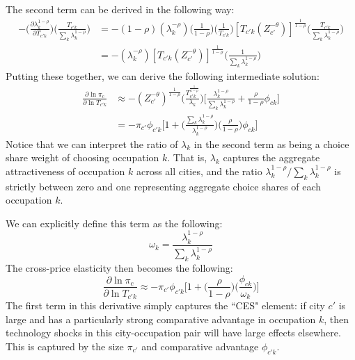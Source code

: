 \documentclass[12pt]{article}
\begin{document}
The second term can be derived in the following way:
\begin{align*}
    - \Big(\frac{\partial\lambda_{k}^{1-\rho}}{\partial{T_{{c'}k}}}\Big)\Big(\frac{T_{{c'}k}}{{\sum\limits_{k}\lambda_{k}^{1-\rho}}}\Big) & = - (1-\rho)(\lambda_{k}^{-\rho})\Big(\frac{1}{1-\rho}\Big)\Big(\frac{1}{T_{{c'}k}}\Big)[{T_{{c'}k}}(Z_{c'}^{-\theta})]^{\frac{1}{1-\rho}}\Big(\frac{T_{{c'}k}}{{\sum\limits_{k}\lambda_{k}^{1-\rho}}}\Big) \\ &= - (\lambda_{k}^{-\rho})[{T_{{c'}k}}(Z_{c'}^{-\theta})]^{\frac{1}{1-\rho}}\Big(\frac{1}{{\sum\limits_{k}\lambda_{k}^{1-\rho}}}\Big)
\end{align*}
Putting these together, we can derive the following intermediate solution:
\begin{align*}
    \frac{\partial\ln{\pi_{c}}}{\partial\ln{T_{{c'}k}}} & \approx - (Z_{c'}^{-\theta})^{\frac{1}{1-\rho}}\Bigg(\frac{T_{{c'}k}^{\frac{1}{1-\rho}}}{\lambda_{k}}\Bigg)\Bigg[\frac{\lambda_{k}^{1-\rho}}{\sum\limits_{k}{\lambda_{k}^{1-\rho}}} + \frac{\rho}{1-\rho}\phi_{ck}\Bigg] \\ &= -{\pi_{c'}}{\phi_{{c'}k}}\Bigg[1+\Bigg(\frac{\sum\limits_{k}{\lambda_{k}^{1-\rho}}}{\lambda_{k}^{1-\rho}}\Bigg)\Bigg(\frac{\rho}{1-\rho}\Bigg)\phi_{ck}\Bigg]
\end{align*}
Notice that we can interpret the ratio of $\lambda_{k}$ in the second term as being a choice share weight of choosing occupation $k$. That is, $\lambda_{k}$ captures the aggregate attractiveness of occupation $k$ across all cities, and the ratio $\lambda_{k}^{1-\rho}/\sum\limits_{k}{\lambda_{k}^{1-\rho}}$ is strictly between zero and one representing aggregate choice shares of each occupation $k$.

We can explicitly define this term as the following:
\begin{equation*}
    \omega_{k} = \frac{\lambda_{k}^{1-\rho}}{\sum\limits_{k}{\lambda_{k}^{1-\rho}}}
\end{equation*}
The cross-price elasticity then becomes the following:
\begin{equation}
    \frac{\partial\ln{\pi_{c}}}{\partial\ln{T_{{c'}k}}} \approx -{\pi_{c'}}{\phi_{{c'}k}}\Big[1+\Big(\frac{\rho}{1-\rho}\Big)\Big(\frac{\phi_{ck}}{\omega_{k}}\Big)\Big]
\end{equation}
The first term in this derivative simply captures the ``CES" element: if city $c'$ is large and has a particularly strong comparative advantage in occupation $k$, then technology shocks in this city-occupation pair will have large effects elsewhere. This is captured by the size $\pi_{c'}$ and comparative advantage $\phi_{{c'}k}$.
\end{document}
